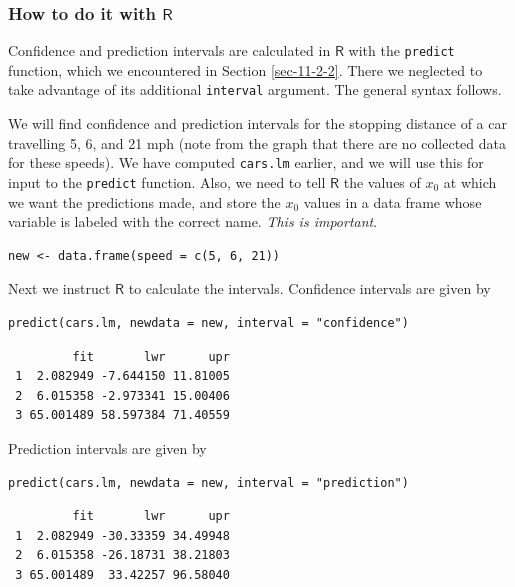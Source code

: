 \documentclass[captions=tableheading]{scrbook}
\begin{document}
\subsubsection{How to do it with \(\mathsf{R}\)}
\label{sec-11-2-5-1}


Confidence and prediction intervals are calculated in \(\mathsf{R}\) with the \texttt{predict} function, which we encountered in Section \ref{sec-11-2-2}. There we neglected to take advantage of its additional \texttt{interval} argument. The general syntax follows. 

\begin{example}
We will find confidence and prediction intervals for the stopping distance of a car travelling 5, 6, and 21 mph (note from the graph that there are no collected data for these speeds). We have computed \texttt{cars.lm} earlier, and we will use this for input to the \texttt{predict} function. Also, we need to tell \(\mathsf{R}\) the values of \(x_{0}\) at which we want the predictions made, and store the \(x_{0}\) values in a data frame whose variable is labeled with the correct name. \emph{This is important}. 


\lstset{language=R}
\begin{lstlisting}
new <- data.frame(speed = c(5, 6, 21))
\end{lstlisting}

Next we instruct \(\mathsf{R}\) to calculate the intervals. Confidence intervals are given by 


\lstset{language=R}
\begin{lstlisting}
predict(cars.lm, newdata = new, interval = "confidence")
\end{lstlisting}

\begin{verbatim}
         fit       lwr      upr
 1  2.082949 -7.644150 11.81005
 2  6.015358 -2.973341 15.00406
 3 65.001489 58.597384 71.40559
\end{verbatim}



Prediction intervals are given by


\lstset{language=R}
\begin{lstlisting}
predict(cars.lm, newdata = new, interval = "prediction")
\end{lstlisting}

\begin{verbatim}
         fit       lwr      upr
 1  2.082949 -30.33359 34.49948
 2  6.015358 -26.18731 38.21803
 3 65.001489  33.42257 96.58040
\end{verbatim}



\end{example}
\end{document}

